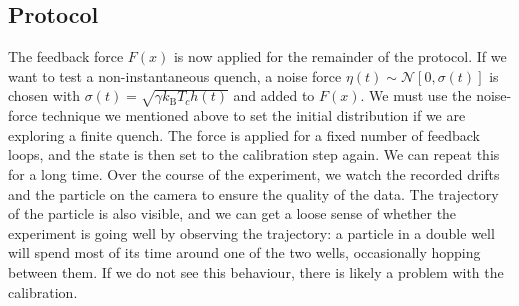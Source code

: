 \documentclass[hyperref={colorlinks=true, urlcolor=blue, citecolor=blue, final, bound}]{sfuthesis}
\newcommand{\kB}{k_{\mathrm{B}}}
\begin{document}
\subsection{Protocol}
The feedback force $F(x)$ is now applied for the remainder of the protocol. If we want to test a non-instantaneous quench, a noise force $\eta(t)\sim\mathcal N[0,\sigma(t)]$ is chosen with $\sigma(t)= \sqrt{\gamma\kB T_ch(t)}$ and added to $F(x)$. We must use the noise-force technique we mentioned above to set the initial distribution if we are exploring a finite quench. The force is applied for a fixed number of feedback loops, and the state is then set to the calibration step again. We can repeat this for a long time. Over the course of the experiment, we watch the recorded drifts and the particle on the camera to ensure the quality of the data. The trajectory of the particle is also visible, and we can get a loose sense of whether the experiment is going well by observing the trajectory: a particle in a double well will spend most of its time around one of the two wells, occasionally hopping between them. If we do not see this behaviour, there is likely a problem with the calibration.
\end{document}
